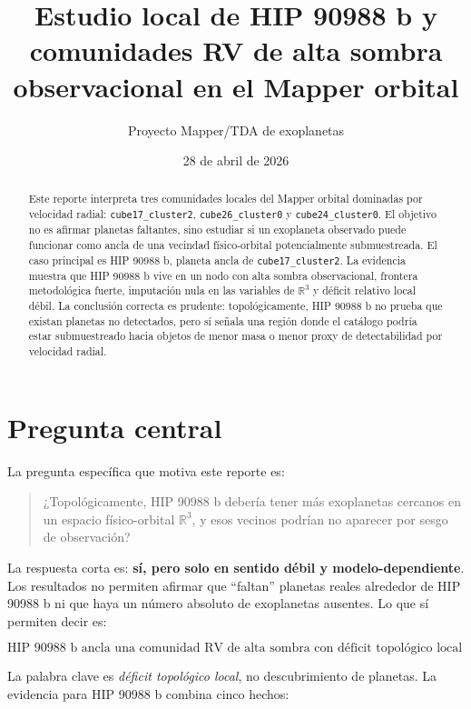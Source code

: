 \documentclass[11pt]{article}
\title{Estudio local de HIP 90988 b y comunidades RV de alta sombra observacional en el Mapper orbital}
\author{Proyecto Mapper/TDA de exoplanetas}
\date{28 de abril de 2026}
\begin{document}
\maketitle

\begin{abstract}
Este reporte interpreta tres comunidades locales del Mapper orbital dominadas por velocidad radial: \texttt{cube17\_cluster2}, \texttt{cube26\_cluster0} y \texttt{cube24\_cluster0}. El objetivo no es afirmar planetas faltantes, sino estudiar si un exoplaneta observado puede funcionar como ancla de una vecindad físico-orbital potencialmente submuestreada. El caso principal es HIP 90988 b, planeta ancla de \texttt{cube17\_cluster2}. La evidencia muestra que HIP 90988 b vive en un nodo con alta sombra observacional, frontera metodológica fuerte, imputación nula en las variables de $\mathbb{R}^3$ y déficit relativo local débil. La conclusión correcta es prudente: topológicamente, HIP 90988 b no prueba que existan planetas no detectados, pero sí señala una región donde el catálogo podría estar submuestreado hacia objetos de menor masa o menor proxy de detectabilidad por velocidad radial.
\end{abstract}

\section{Pregunta central}

La pregunta específica que motiva este reporte es:

\begin{quote}
¿Topológicamente, HIP 90988 b debería tener más exoplanetas cercanos en un espacio físico-orbital $\mathbb{R}^3$, y esos vecinos podrían no aparecer por sesgo de observación?
\end{quote}

La respuesta corta es: \textbf{sí, pero solo en sentido débil y modelo-dependiente}. Los resultados no permiten afirmar que ``faltan'' planetas reales alrededor de HIP 90988 b ni que haya un número absoluto de exoplanetas ausentes. Lo que sí permiten decir es:

\[
\boxed{
\text{HIP 90988 b ancla una comunidad RV de alta sombra con déficit topológico local débil de vecinos compatibles.}
}
\]

La palabra clave es \emph{déficit topológico local}, no descubrimiento de planetas. La evidencia para HIP 90988 b combina cinco hechos:
\end{document}
